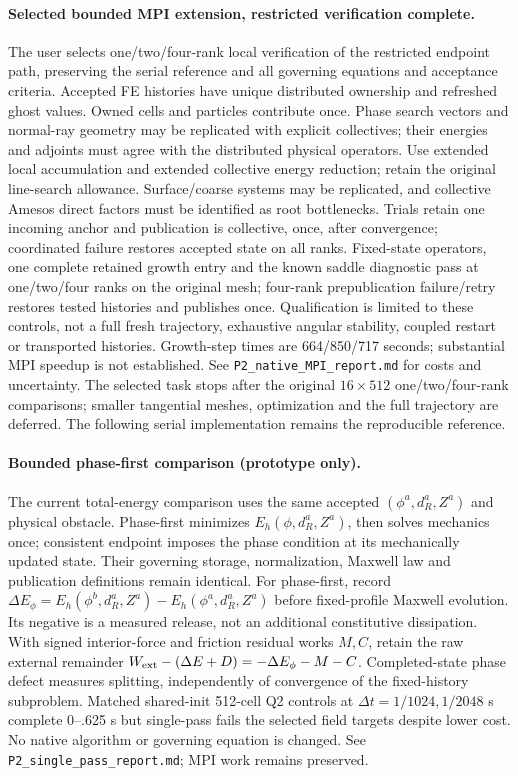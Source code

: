 \documentclass[11pt]{article}
\begin{document}
\paragraph{Selected bounded MPI extension, restricted verification complete.}
The user selects one/two/four-rank local verification of the restricted endpoint
path, preserving the serial reference and all governing equations and acceptance
criteria. Accepted FE histories have unique distributed ownership and refreshed
ghost values. Owned cells and particles contribute once. Phase search vectors
and normal-ray geometry may be replicated with explicit collectives; their
energies and adjoints must agree with the distributed physical operators.
Use extended local accumulation and extended collective energy reduction;
retain the original line-search allowance. Surface/coarse systems may be
replicated, and collective Amesos direct factors must be identified as root
bottlenecks. Trials retain one incoming anchor and publication is collective,
once, after convergence; coordinated failure restores accepted state on all
ranks. Fixed-state operators, one complete retained growth entry and the known
saddle diagnostic pass at one/two/four ranks on the original mesh; four-rank
prepublication failure/retry restores tested histories and publishes once.
Qualification is limited to these controls, not a full fresh trajectory,
exhaustive angular stability, coupled restart or transported histories.
Growth-step times are 664/850/717 seconds; substantial MPI speedup is not
established. See \texttt{P2\_native\_MPI\_report.md} for costs and uncertainty.
The selected task stops after the original $16\times512$ one/two/four-rank
comparisons; smaller tangential meshes, optimization and the full trajectory
are deferred. The following serial implementation remains the reproducible reference.

\paragraph{Bounded phase-first comparison (prototype only).}
The current total-energy comparison uses the same accepted
$(\phi^a,d_R^a,Z^a)$ and physical obstacle. Phase-first minimizes
$E_h(\phi,d_R^a,Z^a)$, then solves mechanics once; consistent endpoint imposes
the phase condition at its mechanically updated state. Their governing storage,
normalization, Maxwell law and publication definitions remain identical.
For phase-first, record
$\Delta E_\phi=E_h(\phi^b,d_R^a,Z^a)-E_h(\phi^a,d_R^a,Z^a)$ before
fixed-profile Maxwell evolution. Its negative is a measured release, not an
additional constitutive dissipation. With signed interior-force and friction
residual works $M,C$, retain the raw external remainder
$W_{\rm ext}-(\Delta E+D)=-\Delta E_\phi-M-C$.
Completed-state phase defect measures splitting, independently of convergence
of the fixed-history subproblem. Matched shared-init 512-cell Q2 controls at
$\Delta t=1/1024,1/2048$ s complete 0--.625 s but single-pass fails the selected
field targets despite lower cost. No native algorithm or governing equation is
changed. See \texttt{P2\_single\_pass\_report.md}; MPI work remains preserved.
\end{document}
